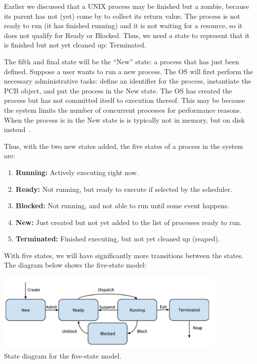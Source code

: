 Earlier we discussed that a UNIX process may be finished but a zombie, because its parent has not (yet) come by to collect its return value. The process is not ready to run (it has finished running) and it is not waiting for a resource, so it does not qualify for Ready or Blocked. Thus, we need a state to represent that it is finished but not yet cleaned up: Terminated.

The fifth and final state will be the ``New'' state: a process that has just been defined. Suppose a user wants to run a new process. The OS will first perform the necessary administrative tasks: define an identifier for the process, instantiate the PCB object, and put the process in the New state. The OS has created the process but has not committed itself to execution thereof. This may be because the system limits the number of concurrent processes for performance reasons. When the process is in the New state is is typically not in memory, but on disk instead~\cite{osi}.

Thus, with the two new states added, the five states of a process in the system are:

\begin{enumerate}
	\item \textbf{Running:} Actively executing right now.
	\item \textbf{Ready:} Not running, but ready to execute if selected by the scheduler.
	\item \textbf{Blocked:} Not running, and not able to run until some event happens.
	\item \textbf{New:} Just created but not yet added to the list of processes ready to run.
	\item \textbf{Terminated:} Finished executing, but not yet cleaned up (reaped).
\end{enumerate}

With five states, we will have significantly more transitions between the states. The diagram below shows the five-state model:

\begin{center}
	\includegraphics[width=0.85\textwidth]{images/5-state-model.png}\\
	State diagram for the five-state model.
\end{center}

